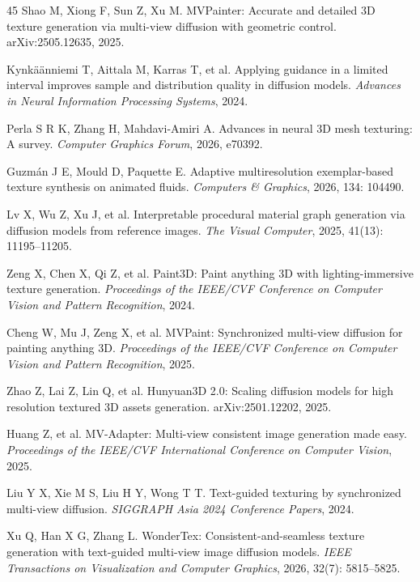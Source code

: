 \documentclass[times,twocolumn,final]{elsarticle}
\begin{document}
\begin{thebibliography}{45}
Shao M, Xiong F, Sun Z, Xu M. MVPainter: Accurate and detailed 3D texture generation via multi-view diffusion with geometric control. arXiv:2505.12635, 2025.

Kynk\"a\"anniemi T, Aittala M, Karras T, et al. Applying guidance in a limited interval improves sample and distribution quality in diffusion models. \textit{Advances in Neural Information Processing Systems}, 2024.

Perla S R K, Zhang H, Mahdavi-Amiri A. Advances in neural 3D mesh texturing: A survey. \textit{Computer Graphics Forum}, 2026, e70392.

Guzm\'an J E, Mould D, Paquette E. Adaptive multiresolution exemplar-based texture synthesis on animated fluids. \textit{Computers \& Graphics}, 2026, 134: 104490.

Lv X, Wu Z, Xu J, et al. Interpretable procedural material graph generation via diffusion models from reference images. \textit{The Visual Computer}, 2025, 41(13): 11195--11205.

Zeng X, Chen X, Qi Z, et al. Paint3D: Paint anything 3D with lighting-immersive texture generation. \textit{Proceedings of the IEEE/CVF Conference on Computer Vision and Pattern Recognition}, 2024.

Cheng W, Mu J, Zeng X, et al. MVPaint: Synchronized multi-view diffusion for painting anything 3D. \textit{Proceedings of the IEEE/CVF Conference on Computer Vision and Pattern Recognition}, 2025.

Zhao Z, Lai Z, Lin Q, et al. Hunyuan3D 2.0: Scaling diffusion models for high resolution textured 3D assets generation. arXiv:2501.12202, 2025.

Huang Z, et al. MV-Adapter: Multi-view consistent image generation made easy. \textit{Proceedings of the IEEE/CVF International Conference on Computer Vision}, 2025.

Liu Y X, Xie M S, Liu H Y, Wong T T. Text-guided texturing by synchronized multi-view diffusion. \textit{SIGGRAPH Asia 2024 Conference Papers}, 2024.

Xu Q, Han X G, Zhang L. WonderTex: Consistent-and-seamless texture generation with text-guided multi-view image diffusion models. \textit{IEEE Transactions on Visualization and Computer Graphics}, 2026, 32(7): 5815--5825.


\end{thebibliography}
\end{document}
